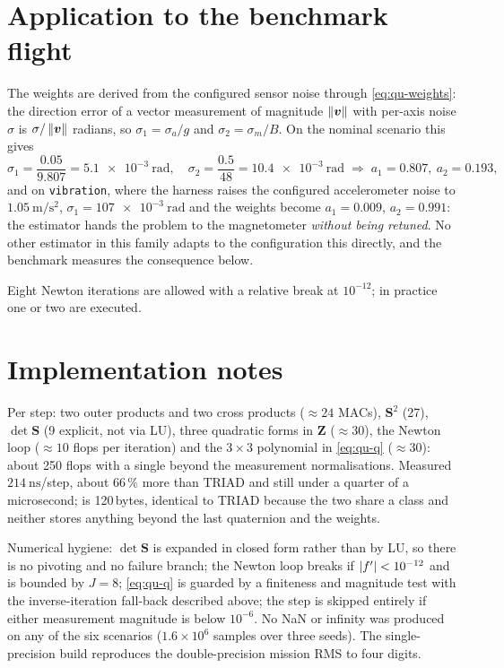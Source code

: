 \section{Application to the benchmark flight}
The weights are derived from the configured sensor noise through \eqref{eq:qu-weights}: the
direction error of a vector measurement of magnitude $\left\lVert \bm{v} \right\rVert$ with per-axis noise $\sigma$ is
$\sigma/\left\lVert \bm{v} \right\rVert$ radians, so $\sigma_1=\sigma_a/g$ and $\sigma_2=\sigma_m/B$. On the nominal
scenario this gives
\begin{equation}
\sigma_1=\frac{0.05}{9.807}=\SI{5.1e-3}{\radian},\quad
\sigma_2=\frac{0.5}{48}=\SI{10.4e-3}{\radian}
\;\Longrightarrow\;
a_1=0.807,\ a_2=0.193 ,
\label{eq:qu-wnom}
\end{equation}
and on \texttt{vibration}, where the harness raises the configured accelerometer noise to
$\SI{1.05}{\metre\per\second\squared}$, $\sigma_1=\SI{107e-3}{\radian}$ and the weights become
$a_1=0.009$, $a_2=0.991$: the estimator hands the problem to the magnetometer \emph{without being
retuned}. No other estimator in this family adapts to the configuration this directly, and the
benchmark measures the consequence below.

Eight Newton iterations are allowed with a relative break at $10^{-12}$; in practice one or two are
executed.

\section{Implementation notes}
Per step: two outer products and two cross products ($\approx24$ MACs), $\bm{S}^2$ (27),
$\det\bm{S}$ (9 explicit, not via LU), three quadratic forms in $\bm{Z}$ ($\approx30$), the Newton
loop ($\approx10$ flops per iteration) and the $3\times3$ polynomial in \eqref{eq:qu-q} ($\approx30$):
about 250 flops with a single  beyond the measurement normalisations. Measured
$\SI{214}{\nano\second}$/step, about $66\,\%$ more than TRIAD and still under a quarter of a
microsecond;  is 120\,bytes, identical to TRIAD because the two share a class and
neither stores anything beyond the last quaternion and the weights.

Numerical hygiene: $\det\bm{S}$ is expanded in closed form rather than by LU, so there is no
pivoting and no failure branch; the Newton loop breaks if $\left\lvert f' \right\rvert<10^{-12}$ and is bounded by
$J=8$; \eqref{eq:qu-q} is guarded by a finiteness and magnitude test with the inverse-iteration
fall-back described above; the step is skipped entirely if either measurement magnitude is below
$10^{-6}$. No NaN or infinity was produced on any of the six scenarios
($1.6\times10^{6}$ samples over three seeds). The single-precision build reproduces the
double-precision mission RMS to four digits.

